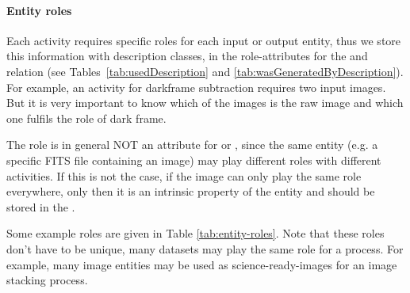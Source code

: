 \paragraph{Entity roles}\label{sec:entity-roles}
Each activity requires specific roles for each input or output entity, thus 
we store this information with description classes, in the role-attributes for 
the  and  relation (see Tables~\ref{tab:usedDescription} and \ref{tab:wasGeneratedByDescription}).
For example, an activity for darkframe subtraction requires two input images. But it is 
very important to know which of the images is the raw image and 
which one fulfils the role of dark frame.

The role is in general NOT an attribute for  or , 
since the same entity (e.g. a specific FITS file containing an image) may play 
different roles with different activities. If this is not the case, if the 
image can only play the same role everywhere, only then it is an intrinsic 
property of the entity and should be stored in the .




Some example roles are given in Table \ref{tab:entity-roles}.
Note that these roles don't have to be unique, many datasets may play the same role for 
a process. For example, many image entities may be used as science-ready-images for an 
image stacking process.

